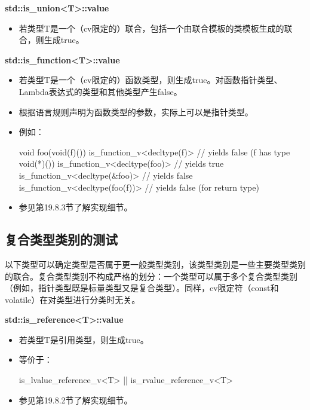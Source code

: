 \textbf{std::is\_union<T>::value}

\begin{itemize}
\item 
若类型T是一个（cv限定的）联合，包括一个由联合模板的类模板生成的联合，则生成true。
\end{itemize}

\textbf{std::is\_function<T>::value}

\begin{itemize}
\item 
若类型T是一个（cv限定的）函数类型，则生成true。对函数指针类型、Lambda表达式的类型和其他类型产生false。

\item 
根据语言规则声明为函数类型的参数，实际上可以是指针类型。

\item 
例如：
\begin{cpp}
void foo(void(f)()) {
	is_function_v<decltype(f)> // yields false (f has type void(*)())
	is_function_v<decltype(foo)> // yields true
	is_function_v<decltype(&foo)> // yields false
	is_function_v<decltype(foo(f))> // yields false (for return type)
}
\end{cpp}

\item 
参见第19.8.3节了解实现细节。
\end{itemize}

\subsection{复合类型类别的测试}

以下类型可以确定类型是否属于更一般类型类别，该类型类别是一些主要类型类别的联合。复合类型类别不构成严格的划分：一个类型可以属于多个复合类型类别（例如，指针类型既是标量类型又是复合类型）。同样，cv限定符（const和volatile）在对类型进行分类时无关。

\textbf{std::is\_reference<T>::value}

\begin{itemize}
\item 
若类型T是引用类型，则生成true。

\item 
等价于： 
\begin{cpp}
is_lvalue_reference_v<T> || is_rvalue_reference_v<T>
\end{cpp}

\item 
参见第19.8.2节了解实现细节。
\end{itemize}


